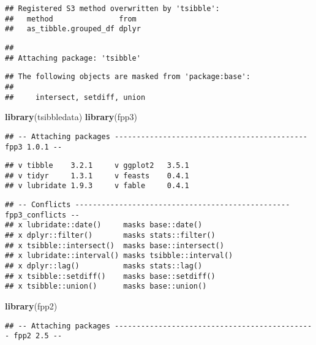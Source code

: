 \documentclass[
]{article}
\newenvironment{Shaded}{\begin{snugshade}}{\end{snugshade}}
\newcommand{\FunctionTok}[1]{\textcolor[rgb]{0.13,0.29,0.53}{\textbf{#1}}}
\newcommand{\NormalTok}[1]{#1}
\begin{document}
\begin{verbatim}
## Registered S3 method overwritten by 'tsibble':
##   method               from 
##   as_tibble.grouped_df dplyr
\end{verbatim}

\begin{verbatim}
## 
## Attaching package: 'tsibble'
\end{verbatim}

\begin{verbatim}
## The following objects are masked from 'package:base':
## 
##     intersect, setdiff, union
\end{verbatim}

\begin{Shaded}
\begin{Highlighting}[]
\FunctionTok{library}\NormalTok{(tsibbledata)}
\FunctionTok{library}\NormalTok{(fpp3)}
\end{Highlighting}
\end{Shaded}

\begin{verbatim}
## -- Attaching packages -------------------------------------------- fpp3 1.0.1 --
\end{verbatim}

\begin{verbatim}
## v tibble    3.2.1     v ggplot2   3.5.1
## v tidyr     1.3.1     v feasts    0.4.1
## v lubridate 1.9.3     v fable     0.4.1
\end{verbatim}

\begin{verbatim}
## -- Conflicts ------------------------------------------------- fpp3_conflicts --
## x lubridate::date()     masks base::date()
## x dplyr::filter()       masks stats::filter()
## x tsibble::intersect()  masks base::intersect()
## x lubridate::interval() masks tsibble::interval()
## x dplyr::lag()          masks stats::lag()
## x tsibble::setdiff()    masks base::setdiff()
## x tsibble::union()      masks base::union()
\end{verbatim}

\begin{Shaded}
\begin{Highlighting}[]
\FunctionTok{library}\NormalTok{(fpp2)}
\end{Highlighting}
\end{Shaded}

\begin{verbatim}
## -- Attaching packages ---------------------------------------------- fpp2 2.5 --
\end{verbatim}
\end{document}

